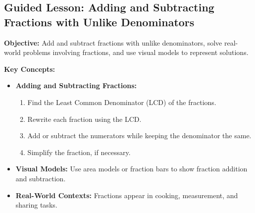 \documentclass[12pt]{article}
\title{}
\date{}
\begin{document}
\subsection*{Guided Lesson: Adding and Subtracting Fractions with Unlike Denominators}
\onehalfspacing

\begin{tcolorbox}[colframe=black!40, colback=gray!5, 
coltitle=black, colbacktitle=black!20, fonttitle=\bfseries\Large, 
title=Learning Objective, halign title=center, left=5pt, right=5pt, top=5pt, bottom=15pt]
\textbf{Objective:} Add and subtract fractions with unlike denominators, solve real-world problems involving fractions, and use visual models to represent solutions.
\end{tcolorbox}

\vspace{1em}

\begin{tcolorbox}[colframe=black!60, colback=white, 
coltitle=black, colbacktitle=black!15, fonttitle=\bfseries\Large, 
title=Key Concepts and Vocabulary, halign title=center, left=10pt, right=10pt, top=10pt, bottom=15pt]
\textbf{Key Concepts:}
\begin{itemize}
    \item \textbf{Adding and Subtracting Fractions:}
    \begin{enumerate}
        \item Find the Least Common Denominator (LCD) of the fractions.
        \item Rewrite each fraction using the LCD.
        \item Add or subtract the numerators while keeping the denominator the same.
        \item Simplify the fraction, if necessary.
    \end{enumerate}
    \item \textbf{Visual Models:} Use area models or fraction bars to show fraction addition and subtraction.
    \item \textbf{Real-World Contexts:} Fractions appear in cooking, measurement, and sharing tasks.
\end{itemize}
\end{tcolorbox}

\vspace{1em}
\end{document}
